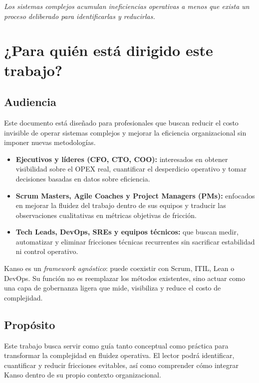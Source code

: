 {\epigraph{\textit{Los sistemas complejos acumulan ineficiencias operativas a menos que exista un proceso deliberado para identificarlas y reducirlas.}}{}}

\section{¿Para quién está dirigido este trabajo?}

\subsection*{Audiencia}
Este documento está diseñado para profesionales que buscan reducir el costo invisible de operar sistemas complejos y mejorar la eficiencia organizacional sin imponer nuevas metodologías.

\begin{itemize}
    \item \textbf{Ejecutivos y líderes (CFO, CTO, COO):} interesados en obtener visibilidad sobre el OPEX real, cuantificar el desperdicio operativo y tomar decisiones basadas en datos sobre eficiencia.
    \item \textbf{Scrum Masters, Agile Coaches y Project Managers (PMs):} enfocados en mejorar la fluidez del trabajo dentro de sus equipos y traducir las observaciones cualitativas en métricas objetivas de fricción.
    \item \textbf{Tech Leads, DevOps, SREs y equipos técnicos:} que buscan medir, automatizar y eliminar fricciones técnicas recurrentes sin sacrificar estabilidad ni control operativo.
\end{itemize}

Kanso es un \textit{framework agnóstico}: puede coexistir con Scrum, ITIL, Lean o DevOps. Su función no es reemplazar los métodos existentes, sino actuar como una capa de gobernanza ligera que mide, visibiliza y reduce el costo de complejidad.

\subsection*{Propósito}
Este trabajo busca servir como guía tanto conceptual como práctica para transformar la complejidad en fluidez operativa.  
El lector podrá identificar, cuantificar y reducir fricciones evitables, así como comprender cómo integrar Kanso dentro de su propio contexto organizacional.


